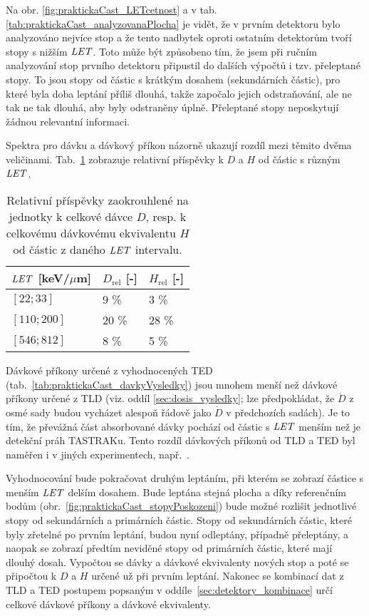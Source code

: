 Na obr. \ref{fig:praktickaCast_LETcetnost} a v tab. \ref{tab:praktickaCast_analyzovanaPlocha} je vidět, že v prvním detektoru bylo analyzováno nejvíce stop a že tento nadbytek oproti ostatním detektorům tvoří stopy s nižším $\mathit{LET}$. Toto může být způsobeno tím, že jsem při ručním analyzování stop prvního detektoru připustil do dalších výpočtů i tzv. přeleptané stopy. To jsou stopy od částic s krátkým dosahem (sekundárních částic), pro které byla doba leptání příliš dlouhá, takže započalo jejich odstraňování, ale ne tak ne tak dlouhá, aby byly odstraněny úplně. Přeleptané stopy neposkytují žádnou relevantní informaci.

Spektra pro dávku a dávkový příkon názorně ukazují rozdíl mezi těmito dvěma veličinami. Tab.~\ref{tab:praktickaCast_relPrispevkyDavka} zobrazuje relativní příspěvky k $D$ a $H$ od částic s různým $\mathit{LET}$.
\begin{table}[ht]
  \centering
  \caption{Relativní příspěvky zaokrouhlené na jednotky k celkové dávce $D$, resp. k celkovému dávkovému ekvivalentu $H$ od částic z daného $\mathit{LET}$ intervalu.}
  \label{tab:praktickaCast_relPrispevkyDavka}
  \begin{tabular}{lll}
	\toprule
	$\mathit{LET}$ [keV/$\mu$m]& $D_{\text{rel}}$ [-]&$H_{\text{rel}}$ [-]\\
	\midrule
	$[22;33]$&9 \%&3 \%\\
	$[110;200]$&20 \%&28 \%\\
	$[546;812]$&8 \%&5 \%\\
	\bottomrule
  \end{tabular}
\end{table}

Dávkové příkony určené z vyhodnocených TED (tab.~\ref{tab:praktickaCast_davkyVysledky}) jsou mnohem menší než dávkové příkony určené z TLD (viz. oddíl \ref{sec:dosis_vysledky}; lze předpokládat, že $\dot{D}$ z osmé sady budou vycházet alespoň řádově jako $\dot{D}$ v předchozích sadách). Je to tím, že převážná část absorbované dávky pochází od částic s $\mathit{LET}$ menším než je detekční práh TASTRAKu. Tento rozdíl dávkových příkonů od TLD a TED byl naměřen i v jiných experimentech, např.~\cite{passDetectors,ambrozova_dvaExperimenty, japonsky}.

Vyhodnocování bude pokračovat druhým leptáním, při kterém se zobrazí částice s menším $\mathit{LET}$ delším dosahem. Bude leptána stejná plocha a díky referenčním bodům (obr.~\ref{fig:praktickaCast_stopyPoskozeni}) bude možné rozlišit jednotlivé stopy od sekundárních a primárních částic. Stopy od sekundárních částic, které byly zřetelné po prvním leptání, budou nyní odleptány, případně přeleptány, a naopak se zobrazí předtím neviděné stopy od primárních částic, které mají dlouhý dosah. Vypočtou se dávky a dávkové ekvivalenty nových stop a poté se připočtou k $D$ a $H$ určené už při prvním leptání. Nakonec se kombinací dat z TLD a TED postupem popsaným v oddíle~\ref{sec:detektory_kombinace} určí celkové dávkové příkony a dávkové ekvivalenty.
